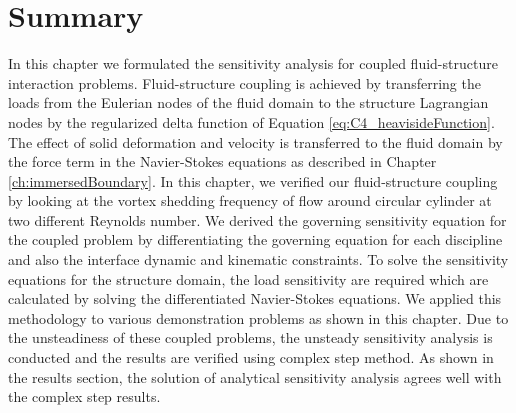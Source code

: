 \section{Summary}
In this chapter we formulated the sensitivity analysis for coupled fluid-structure interaction problems. Fluid-structure coupling is achieved by transferring the loads from the Eulerian nodes of the fluid domain to the structure Lagrangian nodes by the regularized delta function of Equation \eqref{eq:C4_heavisideFunction}. The effect of solid deformation and velocity is transferred to the fluid domain by the force term in the Navier-Stokes equations as described in Chapter \ref{ch:immersedBoundary}. In this chapter, we verified our fluid-structure coupling by looking at the vortex shedding frequency of flow around circular cylinder at two different Reynolds number. We derived the governing sensitivity equation for the coupled problem by differentiating the governing equation for each discipline and also the interface dynamic and kinematic constraints. To solve the sensitivity equations for the structure domain, the load sensitivity are required which are calculated by solving the differentiated Navier-Stokes equations. We applied this methodology to  various demonstration problems as shown in this chapter. Due to the unsteadiness of these coupled problems, the unsteady sensitivity analysis is conducted and the results are verified using complex step method. As shown in the results section, the solution of analytical sensitivity analysis agrees well with the complex step results.